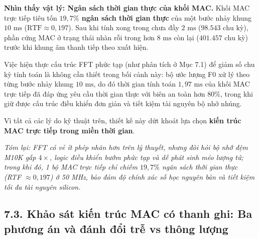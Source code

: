 \begin{physicalinsight}
\textbf{Nhìn thấy vật lý: Ngân sách thời gian thực của khối MAC.}
Khối MAC trực tiếp tiêu tốn \textbf{$19{,}7\%$ ngân sách thời gian thực} của một bước nhảy khung $10\text{ ms}$ ($\text{RTF} \approx 0{,}197$). Sau khi tính xong trong chưa đầy $2\text{ ms}$ ($98.543\text{ chu kỳ}$), phần cứng MAC ở trạng thái nhàn rỗi trong hơn $8\text{ ms}$ còn lại ($401.457\text{ chu kỳ}$) trước khi khung âm thanh tiếp theo xuất hiện.
\par\noindent Việc hiện thực cấu trúc FFT phức tạp (như phân tích ở Mục 7.1) để giảm số chu kỳ tính toán là không cần thiết trong bối cảnh này: bộ ước lượng F0 xử lý theo từng bước nhảy khung $10\text{ ms}$, do đó thời gian tính toán $1{,}97\text{ ms}$ của khối MAC trực tiếp đã đáp ứng yêu cầu thời gian thực với biên an toàn hơn $80\%$, trong khi giữ được cấu trúc điều khiển đơn giản và tiết kiệm tài nguyên bộ nhớ nhúng.
\end{physicalinsight}

Vì tất cả các lý do kỹ thuật trên, thiết kế này dứt khoát lựa chọn \textbf{kiến trúc MAC trực tiếp trong miền thời gian}. 

\textit{Tóm lại: FFT có vẻ ít phép nhân hơn trên lý thuyết, nhưng đòi hỏi bộ nhớ đệm M10K gấp $4\times$, logic điều khiển bướm phức tạp và dễ phát sinh méo lượng tử; trong khi đó, 1 bộ MAC trực tiếp chỉ chiếm $19{,}7\%$ ngân sách thời gian thực (RTF $\approx 0{,}197$) ở 50 MHz, bảo đảm độ chính xác số học nguyên bản và tiết kiệm tối đa tài nguyên silicon.}


\subsection*{7.3. Khảo sát kiến trúc MAC có thanh ghi: Ba phương án và đánh đổi trễ vs thông lượng}

